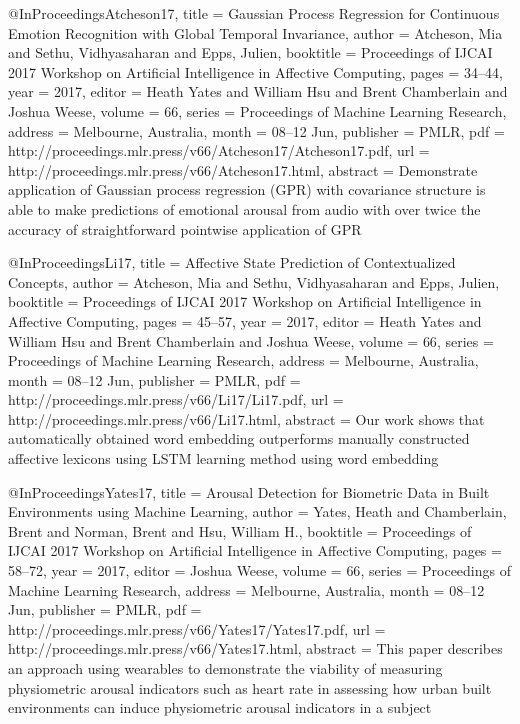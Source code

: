 @InProceedings{Atcheson17,
  title = {Gaussian Process Regression for Continuous Emotion Recognition with Global Temporal Invariance},
  author = {Atcheson, Mia and Sethu, Vidhyasaharan and Epps, Julien},
  booktitle = {Proceedings of IJCAI 2017 Workshop on Artificial Intelligence in Affective Computing},
  pages = 	 {34--44},
  year = 	 {2017},
  editor =    {Heath Yates and William Hsu and Brent Chamberlain and Joshua Weese},
  volume = 	 {66},
  series = 	 {Proceedings of Machine Learning Research},
  address =  {Melbourne, Australia},
  month = 	 {08--12 Jun},
  publisher = {PMLR},
  pdf = 	 {http://proceedings.mlr.press/v66/Atcheson17/Atcheson17.pdf},
  url = 	 {http://proceedings.mlr.press/v66/Atcheson17.html},
  abstract = {Demonstrate application of Gaussian process regression (GPR) with covariance structure is able to make predictions of emotional arousal from audio with over twice the accuracy of straightforward pointwise application of GPR}
}

@InProceedings{Li17,
  title = {Affective State Prediction of Contextualized Concepts},
  author = {Atcheson, Mia and Sethu, Vidhyasaharan and Epps, Julien},
  booktitle = {Proceedings of IJCAI 2017 Workshop on Artificial Intelligence in Affective Computing},
  pages = 	 {45--57},
  year = 	 {2017},
  editor =    {Heath Yates and William Hsu and Brent Chamberlain and Joshua Weese},
  volume = 	 {66},
  series = 	 {Proceedings of Machine Learning Research},
  address =  {Melbourne, Australia},
  month = 	 {08--12 Jun},
  publisher = {PMLR},
  pdf = 	 {http://proceedings.mlr.press/v66/Li17/Li17.pdf},
  url = 	 {http://proceedings.mlr.press/v66/Li17.html},
  abstract = {Our work shows that automatically obtained word embedding outperforms manually constructed affective lexicons using LSTM learning method using word embedding}
}

@InProceedings{Yates17,
  title = {Arousal Detection for Biometric Data in Built Environments using Machine Learning},
  author = {Yates, Heath and Chamberlain, Brent and Norman, Brent and Hsu, William H.},
  booktitle = {Proceedings of IJCAI 2017 Workshop on Artificial Intelligence in Affective Computing},
  pages = 	 {58--72},
  year = 	 {2017},
  editor =    {Joshua Weese},
  volume = 	 {66},
  series = 	 {Proceedings of Machine Learning Research},
  address =  {Melbourne, Australia},
  month = 	 {08--12 Jun},
  publisher = {PMLR},
  pdf = 	 {http://proceedings.mlr.press/v66/Yates17/Yates17.pdf},
  url = 	 {http://proceedings.mlr.press/v66/Yates17.html},
  abstract = {This paper describes an approach using wearables to demonstrate the viability of measuring physiometric arousal indicators such as heart rate in assessing how urban built environments can induce physiometric arousal indicators in a subject}
}



